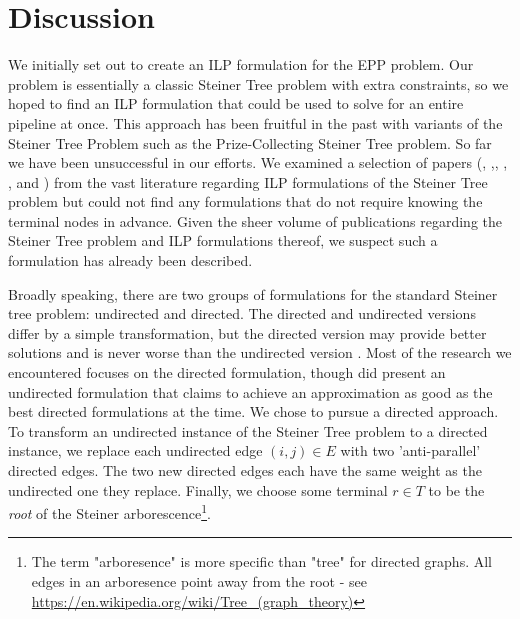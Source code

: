 \documentclass{acmart}
\begin{document}
 	\section{Discussion}
 	We initially set out to create an ILP formulation for the EPP problem. Our problem is essentially a classic Steiner Tree problem with extra constraints, so we hoped to find an ILP formulation that could be used to solve for an entire pipeline at once. This approach has been fruitful in the past with variants of the Steiner Tree Problem such as the Prize-Collecting Steiner Tree problem. So far we have been unsuccessful in our efforts.  We examined a selection of papers (\cite{Aneja1980AnIL}, \cite{Goemans1993ACO},\cite{Koch1998SolvingST}, \cite{Ljubic2005SolvingTP}, \cite{brandstater15}, and \cite{haouari2010strength}) from the vast literature regarding ILP formulations of the Steiner Tree problem but could not find any formulations that do not require knowing the terminal nodes in advance. Given the sheer volume of publications regarding the Steiner Tree problem and ILP formulations thereof, we suspect such a formulation has already been described.
 	
 	Broadly speaking, there are two groups of formulations for the standard Steiner tree problem: undirected and directed. The directed and undirected versions differ by a simple transformation, but the directed version may provide better solutions and is never worse than the undirected version \cite{rao1988steiner}. Most of the research we encountered focuses on the directed formulation, though \cite{Goemans1993ACO} did present an undirected formulation that claims to achieve an approximation as good as the best directed formulations at the time. We chose to pursue a directed approach.
 	To transform an undirected instance of the Steiner Tree problem to a directed instance, we replace each undirected edge $(i,j) \in E$ with two 'anti-parallel' directed edges. The two new directed edges each have the same weight as the undirected one they replace. Finally, we choose some terminal $r \in T$ to be the \textit{root} of the Steiner arborescence\footnote{The term "arboresence" is more specific than "tree" for directed graphs. All edges in an arboresence point away from the root - see \url{https://en.wikipedia.org/wiki/Tree_(graph_theory)}}. 
 	
\end{document}
